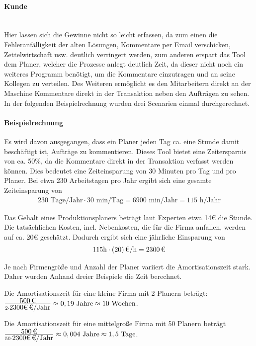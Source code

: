 \paragraph{Kunde}\mbox{} \\
Hier lassen sich die Gewinne nicht so leicht erfassen, da zum einen die Fehleranfälligkeit der alten Lösungen, Kommentare per Email verschicken, Zettelwirtschaft usw. deutlich verringert werden, zum anderen erspart das Tool dem Planer, welcher die Prozesse anlegt deutlich Zeit, da dieser nicht noch ein weiteres Programm benötigt, um die Kommentare einzutragen und an seine Kollegen zu verteilen. Des Weiteren ermöglicht es den Mitarbeitern direkt an der Maschine Kommentare direkt in der Transaktion neben den Aufträgen zu sehen. In der folgenden Beispielrechnung wurden drei Scenarien einmal durchgerechnet. 

\paragraph{Beispielrechnung}
Es wird davon ausgegangen, dass ein Planer jeden Tag ca. eine Stunde damit beschäftigt ist, Aufträge zu kommentieren. Dieses Tool bietet eine Zeitersparnis von ca. 50\%, da die Kommentare direkt in der Transaktion verfasst werden können. Dies bedeutet eine Zeiteinsparung von 30 Minuten pro Tag und pro Planer. Bei etwa 230 Arbeitstagen pro Jahr ergibt sich eine gesamte Zeiteinsparung von  
\begin{eqnarray}
230 \mbox{ Tage/Jahr} \cdot 30 \mbox{ min/Tag} = 6900 \mbox{ min/Jahr} = 115 \mbox{ h/Jahr} 
\end{eqnarray}

Das Gehalt eines Produktionsplaners beträgt laut Experten etwa 14€ die Stunde. Die tatsächlichen Kosten, incl. Nebenkosten, die für die Firma anfallen, werden auf ca. 20€ geschätzt. Dadurch ergibt sich eine jährliche Einsparung von 
\begin{eqnarray}
115 \mbox{h} \cdot \eur{(20)}{\mbox{/h}} = \eur{2300}
\end{eqnarray}

Je nach Firmengröße und Anzahl der Planer variiert die Amortisationszeit stark. Daher wurden Anhand dreier Beispiele die Zeit berechnet.

Die Amortisationszeit für eine kleine Firma mit 2 Planern beträgt:
$\frac{\eur{500}}{2 \cdot \eur{2300€} \mbox{/Jahr} } \approx 0,19 \mbox{ Jahre} \approx 10 \mbox{ Wochen}$.

Die Amortisationszeit für eine mittelgroße Firma mit 50 Planern beträgt
$\frac{\eur{500}}{50 \cdot \eur{2300€} \mbox{/Jahr} } \approx 0,004 \mbox{ Jahre} \approx 1,5 \mbox{ Tage}$.


